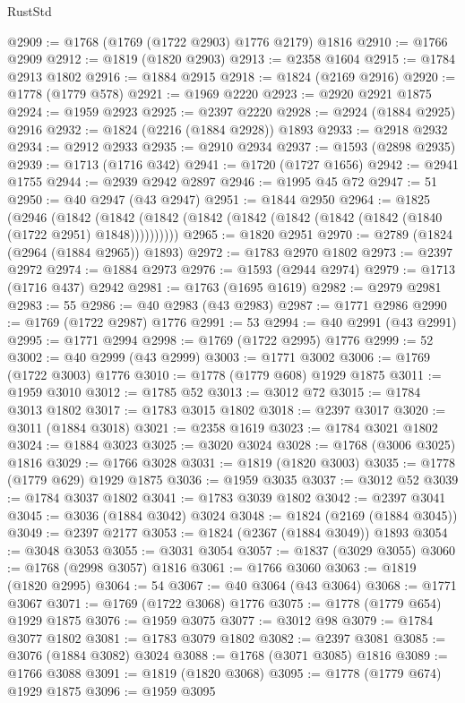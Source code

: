\begin{lexlean}{RustStd}
\begin{coremodule}
@2909 := @1768 (@1769 (@1722 @2903) @1776 @2179) @1816
@2910 := @1766 @2909
@2912 := @1819 (@1820 @2903)
@2913 := @2358 @1604
@2915 := @1784 @2913 @1802
@2916 := @1884 @2915
@2918 := @1824 (@2169 @2916)
@2920 := @1778 (@1779 @578)
@2921 := @1969 @2220
@2923 := @2920 @2921 @1875
@2924 := @1959 @2923
@2925 := @2397 @2220
@2928 := @2924 (@1884 @2925) @2916
@2932 := @1824 (@2216 (@1884 @2928)) @1893
@2933 := @2918 @2932
@2934 := @2912 @2933
@2935 := @2910 @2934
@2937 := @1593 (@2898 @2935)
@2939 := @1713 (@1716 @342)
@2941 := @1720 (@1727 @1656)
@2942 := @2941 @1755
@2944 := @2939 @2942 @2897
@2946 := @1995 @45 @72
@2947 := 51
@2950 := @40 @2947 (@43 @2947)
@2951 := @1844 @2950
@2964 := @1825
    (@2946
      (@1842 (@1842 (@1842 (@1842 (@1842 (@1842 (@1842 (@1842 (@1840 (@1722 @2951) @1848))))))))))
@2965 := @1820 @2951
@2970 := @2789 (@1824 (@2964 (@1884 @2965)) @1893)
@2972 := @1783 @2970 @1802
@2973 := @2397 @2972
@2974 := @1884 @2973
@2976 := @1593 (@2944 @2974)
@2979 := @1713 (@1716 @437) @2942
@2981 := @1763 (@1695 @1619)
@2982 := @2979 @2981
@2983 := 55
@2986 := @40 @2983 (@43 @2983)
@2987 := @1771 @2986
@2990 := @1769 (@1722 @2987) @1776
@2991 := 53
@2994 := @40 @2991 (@43 @2991)
@2995 := @1771 @2994
@2998 := @1769 (@1722 @2995) @1776
@2999 := 52
@3002 := @40 @2999 (@43 @2999)
@3003 := @1771 @3002
@3006 := @1769 (@1722 @3003) @1776
@3010 := @1778 (@1779 @608) @1929 @1875
@3011 := @1959 @3010
@3012 := @1785 @52
@3013 := @3012 @72
@3015 := @1784 @3013 @1802
@3017 := @1783 @3015 @1802
@3018 := @2397 @3017
@3020 := @3011 (@1884 @3018)
@3021 := @2358 @1619
@3023 := @1784 @3021 @1802
@3024 := @1884 @3023
@3025 := @3020 @3024
@3028 := @1768 (@3006 @3025) @1816
@3029 := @1766 @3028
@3031 := @1819 (@1820 @3003)
@3035 := @1778 (@1779 @629) @1929 @1875
@3036 := @1959 @3035
@3037 := @3012 @52
@3039 := @1784 @3037 @1802
@3041 := @1783 @3039 @1802
@3042 := @2397 @3041
@3045 := @3036 (@1884 @3042) @3024
@3048 := @1824 (@2169 (@1884 @3045))
@3049 := @2397 @2177
@3053 := @1824 (@2367 (@1884 @3049)) @1893
@3054 := @3048 @3053
@3055 := @3031 @3054
@3057 := @1837 (@3029 @3055)
@3060 := @1768 (@2998 @3057) @1816
@3061 := @1766 @3060
@3063 := @1819 (@1820 @2995)
@3064 := 54
@3067 := @40 @3064 (@43 @3064)
@3068 := @1771 @3067
@3071 := @1769 (@1722 @3068) @1776
@3075 := @1778 (@1779 @654) @1929 @1875
@3076 := @1959 @3075
@3077 := @3012 @98
@3079 := @1784 @3077 @1802
@3081 := @1783 @3079 @1802
@3082 := @2397 @3081
@3085 := @3076 (@1884 @3082) @3024
@3088 := @1768 (@3071 @3085) @1816
@3089 := @1766 @3088
@3091 := @1819 (@1820 @3068)
@3095 := @1778 (@1779 @674) @1929 @1875
@3096 := @1959 @3095

\end{coremodule}
\end{lexlean}
